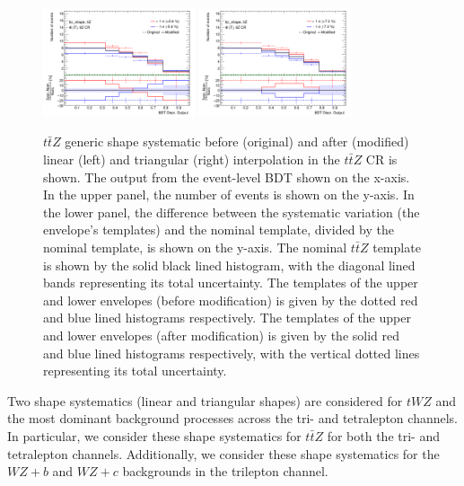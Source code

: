 \begin{figure}[h!]
  \includegraphics[width=0.4\textwidth]{figures/lep4_ttZ_4T_ttz_shape_20percent_linear.png}
  \includegraphics[width=0.4\textwidth]{figures/lep4_ttZ_4T_ttz_shape_20percent_triangular.png}
  \centering
  
  \caption{$t\bar{t}Z$ generic shape systematic before (original) and after (modified) linear (left) and triangular (right) interpolation in the $t\bar{t}Z$ CR is shown. The output from the event-level BDT shown on the x-axis. In the upper panel, the number of events is shown on the y-axis. In the lower panel, the difference between the systematic variation (the envelope's templates) and the nominal template, divided by the nominal template, is shown on the y-axis. The nominal $t\bar{t}Z$ template is shown by the solid black lined histogram, with the diagonal lined bands representing its total uncertainty. The templates of the upper and lower envelopes (before modification) is given by the dotted red and blue lined histograms respectively. The templates of the upper and lower envelopes (after modification) is given by the solid red and blue lined histograms respectively, with the vertical dotted lines representing its total uncertainty. }
  \label{fig:genericShapeSystexamples}
\end{figure}

Two shape systematics (linear and triangular shapes) are considered for $tWZ$ and the most dominant background processes across the tri- and tetralepton channels. In particular, we consider these shape systematics for $t\bar{t}Z$ for both the tri- and tetralepton channels. Additionally, we consider these shape systematics for the $WZ+b$ and $WZ+c$ backgrounds in the trilepton channel.


